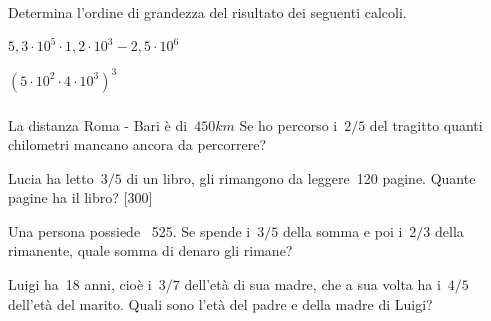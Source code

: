 \begin{esercizio}
 \label{ese:3.74}
Determina l'ordine di grandezza del risultato dei seguenti calcoli.
\begin{multicols}{2}
\begin{enumeratea}
\item $5,3\cdot10^5\cdot1,2\cdot10^3-2,5\cdot10^6$
\item $(5\cdot10^2\cdot4\cdot10^3)^3$
\end{enumeratea}
\end{multicols}
\end{esercizio}

\subsubsection*{}

\begin{esercizio}
 \label{ese:3.75}
La distanza Roma - Bari è di~$450\unit{km}$ Se ho percorso i~$2/5$ del 
tragitto quanti chilometri
mancano ancora da percorrere?
\end{esercizio}

\begin{esercizio}[\Ast]
 \label{ese:3.76}
Lucia ha letto~$3/5$ di un libro, gli rimangono da leggere~120 pagine. 
Quante pagine ha il libro? \hfill [300]
\end{esercizio}

\begin{esercizio}
 \label{ese:3.77}
Una persona possiede \officialeuro\ 525. Se spende i~$3/5$ della somma e 
poi i~$2/3$ della rimanente, quale somma di denaro gli rimane?
\end{esercizio}

\begin{esercizio}
 \label{ese:3.78}
Luigi ha~18 anni, cioè i~$3/7$ dell'età di sua madre, che a sua volta ha 
i~$4/5$ dell'età del marito. Quali sono l'età del padre e della madre di Luigi?
\end{esercizio}

\subsubsection*{}

